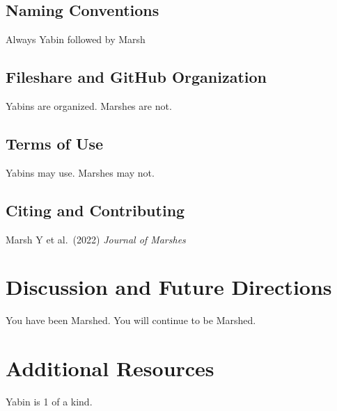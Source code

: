 \documentclass[
]{article}
\begin{document}
\hypertarget{naming-conventions}{%
\subsection{Naming Conventions}\label{naming-conventions}}

Always Yabin followed by Marsh

\hypertarget{fileshare-and-github-organization}{%
\subsection{Fileshare and GitHub Organization}\label{fileshare-and-github-organization}}

Yabins are organized. Marshes are not.

\hypertarget{terms-of-use}{%
\subsection{Terms of Use}\label{terms-of-use}}

Yabins may use. Marshes may not.

\hypertarget{citing-and-contributing}{%
\subsection{Citing and Contributing}\label{citing-and-contributing}}

Marsh Y et al.~(2022) \textit{Journal of Marshes}

\hypertarget{discussion-and-future-directions}{%
\section{Discussion and Future Directions}\label{discussion-and-future-directions}}

You have been Marshed. You will continue to be Marshed.

\hypertarget{additional-resources}{%
\section{Additional Resources}\label{additional-resources}}

Yabin is 1 of a kind.
\end{document}
